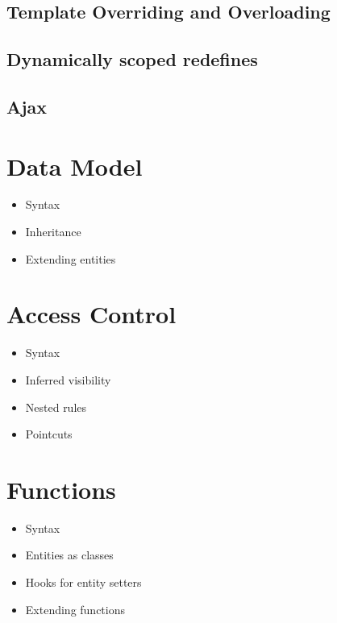     \subsection{\label{subsec:template-overriding}Template Overriding and Overloading}

    \subsection{\label{subsec:redefines}Dynamically scoped redefines}

    \subsection{\label{subsec:ajax}Ajax}

  \section{\label{sec:data-model}Data Model}

    \begin{itemize}
      \item Syntax
      \item Inheritance
      \item Extending entities
    \end{itemize}

  \section{\label{sec:access-control}Access Control}

    \begin{itemize}
      \item Syntax
      \item Inferred visibility
      \item Nested rules
      \item Pointcuts
    \end{itemize}

  \section{\label{sec:functions}Functions}

    \begin{itemize}
      \item Syntax
      \item Entities as classes
      \item Hooks for entity setters
      \item Extending functions
    \end{itemize}

